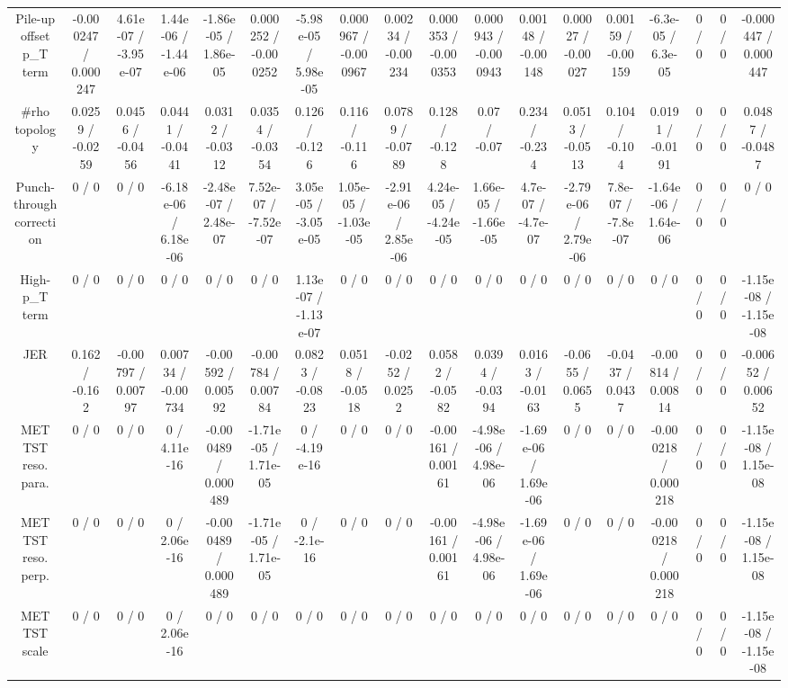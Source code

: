 \documentclass[10pt]{article}
\begin{document}
\begin{table}[htbp]
\begin{center}
\begin{tabular}{|c|c|c|c|c|c|c|c|c|c|c|c|c|c|c|c|c|c|}
  Pile-up offset p_{T} term & -0.000247 / 0.000247 & 4.61e-07 / -3.95e-07 & 1.44e-06 / -1.44e-06 & -1.86e-05 / 1.86e-05 & 0.000252 / -0.000252 & -5.98e-05 / 5.98e-05 & 0.000967 / -0.000967 & 0.00234 / -0.00234 & 0.000353 / -0.000353 & 0.000943 / -0.000943 & 0.00148 / -0.00148 & 0.00027 / -0.00027 & 0.00159 / -0.00159 & -6.3e-05 / 6.3e-05 & 0 / 0 & 0 / 0 & -0.000447 / 0.000447 \\ 
  #rho topology & 0.0259 / -0.0259 & 0.0456 / -0.0456 & 0.0441 / -0.0441 & 0.0312 / -0.0312 & 0.0354 / -0.0354 & 0.126 / -0.126 & 0.116 / -0.116 & 0.0789 / -0.0789 & 0.128 / -0.128 & 0.07 / -0.07 & 0.234 / -0.234 & 0.0513 / -0.0513 & 0.104 / -0.104 & 0.0191 / -0.0191 & 0 / 0 & 0 / 0 & 0.0487 / -0.0487 \\ 
  Punch-through correction & 0 / 0 & 0 / 0 & -6.18e-06 / 6.18e-06 & -2.48e-07 / 2.48e-07 & 7.52e-07 / -7.52e-07 & 3.05e-05 / -3.05e-05 & 1.05e-05 / -1.03e-05 & -2.91e-06 / 2.85e-06 & 4.24e-05 / -4.24e-05 & 1.66e-05 / -1.66e-05 & 4.7e-07 / -4.7e-07 & -2.79e-06 / 2.79e-06 & 7.8e-07 / -7.8e-07 & -1.64e-06 / 1.64e-06 & 0 / 0 & 0 / 0 & 0 / 0 \\ 
  High-p_{T} term & 0 / 0 & 0 / 0 & 0 / 0 & 0 / 0 & 0 / 0 & 1.13e-07 / -1.13e-07 & 0 / 0 & 0 / 0 & 0 / 0 & 0 / 0 & 0 / 0 & 0 / 0 & 0 / 0 & 0 / 0 & 0 / 0 & 0 / 0 & -1.15e-08 / -1.15e-08 \\ 
  JER & 0.162 / -0.162 & -0.00797 / 0.00797 & 0.00734 / -0.00734 & -0.00592 / 0.00592 & -0.00784 / 0.00784 & 0.0823 / -0.0823 & 0.0518 / -0.0518 & -0.0252 / 0.0252 & 0.0582 / -0.0582 & 0.0394 / -0.0394 & 0.0163 / -0.0163 & -0.0655 / 0.0655 & -0.0437 / 0.0437 & -0.00814 / 0.00814 & 0 / 0 & 0 / 0 & -0.00652 / 0.00652 \\ 
  MET TST reso. para. & 0 / 0 & 0 / 0 & 0 / 4.11e-16 & -0.000489 / 0.000489 & -1.71e-05 / 1.71e-05 & 0 / -4.19e-16 & 0 / 0 & 0 / 0 & -0.00161 / 0.00161 & -4.98e-06 / 4.98e-06 & -1.69e-06 / 1.69e-06 & 0 / 0 & 0 / 0 & -0.000218 / 0.000218 & 0 / 0 & 0 / 0 & -1.15e-08 / 1.15e-08 \\ 
  MET TST reso. perp. & 0 / 0 & 0 / 0 & 0 / 2.06e-16 & -0.000489 / 0.000489 & -1.71e-05 / 1.71e-05 & 0 / -2.1e-16 & 0 / 0 & 0 / 0 & -0.00161 / 0.00161 & -4.98e-06 / 4.98e-06 & -1.69e-06 / 1.69e-06 & 0 / 0 & 0 / 0 & -0.000218 / 0.000218 & 0 / 0 & 0 / 0 & -1.15e-08 / 1.15e-08 \\ 
  MET TST scale & 0 / 0 & 0 / 0 & 0 / 2.06e-16 & 0 / 0 & 0 / 0 & 0 / 0 & 0 / 0 & 0 / 0 & 0 / 0 & 0 / 0 & 0 / 0 & 0 / 0 & 0 / 0 & 0 / 0 & 0 / 0 & 0 / 0 & -1.15e-08 / -1.15e-08 \\ 

\end{tabular}
\end{center}
\end{table}
\end{document}
